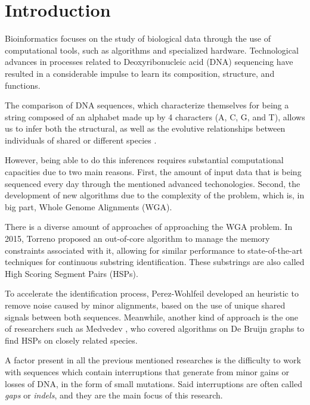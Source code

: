 \section{Introduction}

Bioinformatics focuses on the study of biological data through the use of computational tools, such as algorithms and specialized hardware. Technological advances in processes related to Deoxyribonucleic acid (DNA) sequencing have resulted in a considerable impulse to learn its composition, structure, and functions. 

\medskip

The comparison of DNA sequences, which characterize themselves for being a string composed of an alphabet made up by 4 characters (A, C, G, and T), allows us to infer both the structural, as well as the evolutive relationships between individuals of shared or different species \cite{xiong_2006}.

\medskip

However, being able to do this inferences requires substantial computational capacities due to two main reasons. First, the amount of input data that is being sequenced every day through the mentioned advanced techonologies. Second, the development of new algorithms due to the complexity of the problem, which is, in big part, Whole Genome Alignments (WGA).

\medskip

There is a diverse amount of approaches of approaching the WGA problem. In 2015, Torreno \cite{Tirado2015BreakingTC} proposed an out-of-core algorithm to manage the memory constraints associated with it, allowing for similar performance to state-of-the-art techniques for continuous substring identification. These substrings are also called High Scoring Segment Pairs (HSPs). 

\medskip

To accelerate the identification process, Perez-Wohlfeil \cite{PrezWohlfeil2019UltrafastGC} developed an heuristic to remove noise caused by minor alignments, based on the use of unique shared signals between both sequences. Meanwhile, another kind of approach is the one of researchers such as Medvedev \cite{Minkin2019ScalableMW}, who covered algorithms on De Bruijn graphs to find HSPs on closely related species. 

\medskip

A factor present in all the previous mentioned researches is the difficulty to work with sequences which contain interruptions that generate from minor gains or losses of DNA, in the form of small mutations. Said interruptions are often called \textit{gaps} or \textit{indels}, and they are the main focus of this research. 

